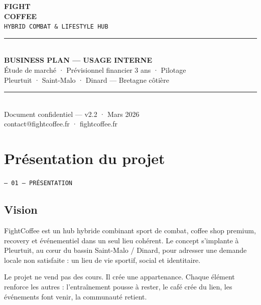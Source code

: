 \documentclass[11pt, a4paper]{article}
\newcommand{\eyebrow}[1]{%
  \vspace{4pt}
  {\small\color{fc-ink3}\texttt{— #1}}
  \vspace{2pt}
}
\begin{document}
\thispagestyle{empty}
\vspace*{3cm}
\begin{center}
  {\fontsize{48}{52}\selectfont\bfseries\color{fc-ink} FIGHT}\\[2pt]
  {\fontsize{48}{52}\selectfont\bfseries\color{fc-red} COFFEE}\\[12pt]
  {\large\color{fc-ink3}\texttt{HYBRID COMBAT \& LIFESTYLE HUB}}\\[40pt]
  \color{fc-rule}\rule{10cm}{0.6pt}\\[24pt]
  {\Large\bfseries\color{fc-ink} BUSINESS PLAN — USAGE INTERNE}\\[10pt]
  {\normalsize\color{fc-ink2} Étude de marché · Prévisionnel financier 3 ans · Pilotage}\\[6pt]
  {\normalsize\color{fc-ink2} Pleurtuit · Saint-Malo · Dinard — Bretagne côtière}\\[40pt]
  \color{fc-rule}\rule{10cm}{0.6pt}\\[20pt]
  {\small\color{fc-ink3} Document confidentiel — v2.2 · Mars 2026}\\[4pt]
  {\small\color{fc-red} contact@fightcoffee.fr · fightcoffee.fr}
\end{center}

\newpage

\tableofcontents
\newpage

\section{Présentation du projet}
\eyebrow{01 — PRÉSENTATION}

\subsection{Vision}

FightCoffee est un hub hybride combinant sport de combat, coffee shop premium, recovery et événementiel dans un seul lieu cohérent. Le concept s'implante à Pleurtuit, au cœur du bassin Saint-Malo / Dinard, pour adresser une demande locale non satisfaite : un lieu de vie sportif, social et identitaire.

Le projet ne vend pas des cours. Il crée une appartenance. Chaque élément renforce les autres : l'entraînement pousse à rester, le café crée du lien, les événements font venir, la communauté retient.
\end{document}
